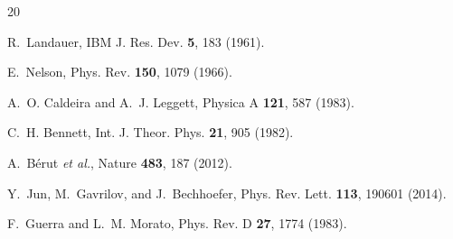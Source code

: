 \documentclass[twocolumn,showpacs,preprintnumbers,amsmath,amssymb]{revtex4-2}
\begin{document}
\begin{thebibliography}{20}

R.~Landauer,
IBM J. Res. Dev. \textbf{5}, 183 (1961).

E.~Nelson,
Phys. Rev. \textbf{150}, 1079 (1966).

A.~O. Caldeira and A.~J. Leggett,
Physica A \textbf{121}, 587 (1983).

C.~H. Bennett,
Int. J. Theor. Phys. \textbf{21}, 905 (1982).

A.~B\'erut \textit{et al.},
Nature \textbf{483}, 187 (2012).

Y.~Jun, M.~Gavrilov, and J.~Bechhoefer,
Phys. Rev. Lett. \textbf{113}, 190601 (2014).

F.~Guerra and L.~M. Morato,
Phys. Rev. D \textbf{27}, 1774 (1983).

\end{thebibliography}
\end{document}
